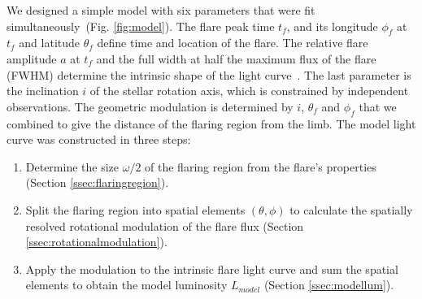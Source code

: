 \documentclass[fleqn,usenatbib,letters]{mnras}%
\begin{document}
We designed a simple model with six parameters that were fit simultaneously~(Fig. \ref{fig:model}). The flare peak time $t_f$, and its longitude $\phi_f$ at $t_f$ and latitude $\theta_f$ define time and location of the flare. The relative flare amplitude $a$ at $t_f$ and the full width at half the maximum flux of the flare (FWHM) determine the intrinsic shape of the light curve~\citep{davenport2014}. The last parameter is the inclination $i$ of the stellar rotation axis, which is constrained by independent observations. The geometric modulation is determined by $i$, $\theta_f$ and $\phi_f$ that we combined to give the distance of the flaring region from the limb. The model light curve was constructed in three steps:
\begin{enumerate}
    \item Determine the size $\omega/2$ of the flaring region from the flare's properties (Section \ref{ssec:flaringregion}). %
    \item Split the flaring region into spatial elements $(\theta, \phi)$ to calculate the spatially resolved rotational modulation of the flare flux (Section \ref{ssec:rotationalmodulation}).
    \item Apply the modulation to the intrinsic flare light curve and sum the spatial elements to obtain the model luminosity $L_{model}$ (Section \ref{ssec:modellum}).
\end{enumerate}
\end{document}
